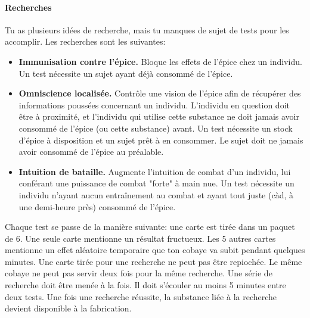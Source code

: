 {	
	\paragraph{Recherches} Tu as plusieurs idées de recherche, mais tu manques de sujet de tests pour les accomplir. Les recherches sont les suivantes:
	\begin{itemize}
		\item \textbf{Immunisation contre l'épice.} Bloque les effets de l'épice chez un individu. Un test nécessite un sujet ayant déjà consommé de l'épice.
		
		\item \textbf{Omniscience localisée.} Contrôle une vision de l'épice afin de récupérer des informations poussées concernant un individu. L'individu en question doit être à proximité, et l'individu qui utilise cette substance ne doit jamais avoir consommé de l'épice (ou cette substance) avant. Un test nécessite un stock d'épice à disposition et un sujet prêt à en consommer. Le sujet doit ne jamais avoir consommé de l'épice au préalable.
		
		\item \textbf{Intuition de bataille.} Augmente l'intuition de combat d'un individu, lui conférant une puissance de combat "forte" à main nue. Un test nécessite un individu n'ayant aucun entraînement au combat et ayant tout juste (càd, à une demi-heure près) consommé de l'épice.
	\end{itemize}
	
	\par Chaque test se passe de la manière suivante: une carte est tirée dans un paquet de 6. Une seule carte mentionne un résultat fructueux. Les 5 autres cartes mentionne un effet aléatoire temporaire que ton cobaye va subit pendant quelques minutes. Une carte tirée pour une recherche ne peut pas être repiochée. Le même cobaye ne peut pas servir deux fois pour la même recherche. Une série de recherche doit être menée à la fois. Il doit s'écouler au moins 5 minutes entre deux tests. Une fois une recherche réussite, la substance liée à la recherche devient disponible à la fabrication.
}




